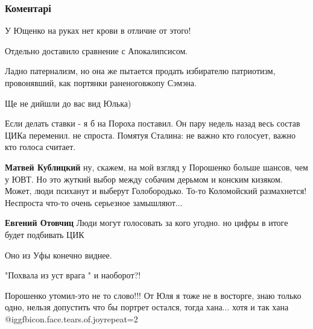  
 
 
 
 
\subsubsection{Коментарі}
\label{sec:02_11_2018.fb.lesev_igor.1.izbiratelnaja_kompania.cmt}

\begin{itemize} %
У Ющенко на руках нет крови в отличие от этого!

Отдельно доставило сравнение с Апокалипсисом.

Ладно патернализм, но она же пытается продать избирателю патриотизм, провонявший, как портянки раненоговжопу Сэмэна.

Ще не дийшли до вас вид Юлька)


Если делать ставки - я б на Пороха поставил. Он пару недель назад весь состав
ЦИКа переменил. не спроста. Помятуя Сталина: не важно кто голосует, важно кто
голоса считает.

\begin{itemize} %
\textbf{Матвей Кублицкий} ну, скажем, на мой взгляд у Порошенко больше шансов, чем у ЮВТ. Но это жуткий выбор между собачим дерьмом и конским кизяком.
Может, люди психанут и выберут Голобородько. То-то Коломойский размахнется! Неспроста что-то очень серьезное замышляют...

\textbf{Евгений Отовчиц} Люди могут голосовать за кого угодно. но цифры в итоге будет подбивать ЦИК

Оно из Уфы конечно виднее.
\end{itemize} %

"Похвала из уст врага " и наоборот?!


Порошенко утомил-это не то слово!!! От Юля я тоже не в восторге, знаю только
одно, нельзя допустить что бы портрет остался, тогда хана... хотя и так хана @igg{fbicon.face.tears.of.joy}{repeat=2} 


\end{itemize}
